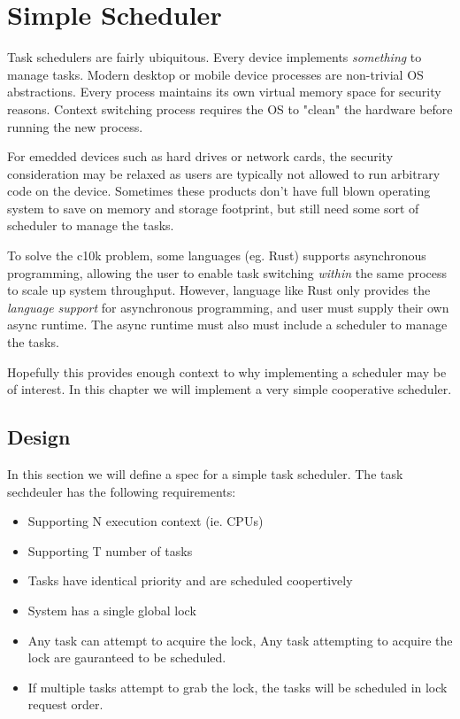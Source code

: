 % 

\chapter{Simple Scheduler}

Task schedulers are fairly ubiquitous. Every device implements
\textit{something} to manage tasks. Modern desktop or mobile device processes
are non-trivial OS abstractions. Every process maintains its own virtual memory
space for security reasons. Context switching process requires the OS to "clean"
the hardware before running the new process.\newline

For emedded devices such as hard drives or network cards, the security
consideration may be relaxed as users are typically not allowed to run arbitrary
code on the device. Sometimes these products don't have full blown operating
system to save on memory and storage footprint, but still need some sort of
scheduler to manage the tasks.\newline

To solve the c10k \cite{c10k} problem, some languages (eg. Rust) supports
asynchronous programming, allowing the user to enable task switching 
\textit{within} the same process to scale up system throughput.  However,
language like Rust only provides the \textit{language support} for asynchronous
programming, and user must supply their own async runtime. The async runtime
must also must include a scheduler to manage the tasks.\newline

Hopefully this provides enough context to why implementing a scheduler may be of
interest. In this chapter we will implement a very simple cooperative
scheduler.

\section{Design}

In this section we will define a spec for a simple task scheduler. The task sechdeuler has the following
requirements:
\begin{itemize}
    \item Supporting N execution context (ie. CPUs)
    \item Supporting T number of tasks
    \item Tasks have identical priority and are scheduled coopertively
    \item System has a single global lock
    \item Any task can attempt to acquire the lock, Any task attempting to
    acquire the lock are gauranteed to be scheduled.
    \item If multiple tasks attempt to grab the lock, the tasks will be
    scheduled in lock request order. 
\end{itemize}


